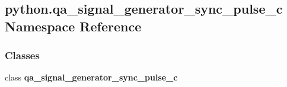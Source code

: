 \subsection{python.\+qa\+\_\+signal\+\_\+generator\+\_\+sync\+\_\+pulse\+\_\+c Namespace Reference}
\label{namespacepython_1_1qa__signal__generator__sync__pulse__c}
\subsubsection*{Classes}
\begin{DoxyCompactItemize}
\item 
class {\bf qa\+\_\+signal\+\_\+generator\+\_\+sync\+\_\+pulse\+\_\+c}
\end{DoxyCompactItemize}
